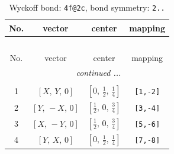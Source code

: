 \documentclass[fleqn,8pt]{jsarticle}
\begin{document}
\renewcommand{\arraystretch}{1.2}
\begin{longtable}{cccc}
\caption{Wyckoff bond: {\tt 4f@2c}, bond symmetry: {\tt 2..}}
 \\
 \hline \hline
No. & vector & center & mapping \\ \hline \endfirsthead

\multicolumn{3}{l}{\tablename\ \thetable{}} \\
 \hline \hline
No. & vector & center & mapping \\ \hline \endhead

 \hline \hline
\multicolumn{3}{r}{\footnotesize\it continued ...} \\ \endfoot

 \hline \hline
\multicolumn{3}{r}{} \\ \endlastfoot

1 & $\left[ X,\, Y,\, 0 \right]$ & $\left[ 0,\, \frac{1}{2},\, \frac{1}{4} \right]$ & {\tt [1,-2]} \\ \hline
2 & $\left[ Y,\, - X,\, 0 \right]$ & $\left[ \frac{1}{2},\, 0,\, \frac{3}{4} \right]$ & {\tt [3,-4]} \\ \hline
3 & $\left[ X,\, - Y,\, 0 \right]$ & $\left[ \frac{1}{2},\, 0,\, \frac{3}{4} \right]$ & {\tt [5,-6]} \\ \hline
4 & $\left[ Y,\, X,\, 0 \right]$ & $\left[ 0,\, \frac{1}{2},\, \frac{1}{4} \right]$ & {\tt [7,-8]} \\
\end{longtable}
\renewcommand{\arraystretch}{1.2}
\end{document}
